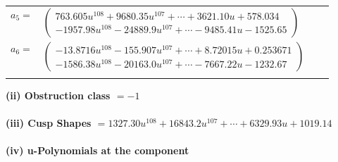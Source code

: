 \documentclass[1p]{elsarticle_modified}
\theoremstyle{definition}
\begin{document}
\begin{tabular}{m{7pt} m{180pt} m{7pt} m{180pt} }
\flushright $a_{5}=$&$\begin{pmatrix}763.605 u^{108}+9680.35 u^{107}+\cdots+3621.10 u+578.034\\-1957.98 u^{108}-24889.9 u^{107}+\cdots-9485.41 u-1525.65\end{pmatrix}$ \\
\flushright $a_{6}=$&$\begin{pmatrix}-13.8716 u^{108}-155.907 u^{107}+\cdots+8.72015 u+0.253671\\-1586.38 u^{108}-20163.0 u^{107}+\cdots-7667.22 u-1232.67\end{pmatrix}$\\&\end{tabular}
\flushleft \textbf{(ii) Obstruction class $= -1$}\\~\\
\flushleft \textbf{(iii) Cusp Shapes $= 1327.30 u^{108}+16843.2 u^{107}+\cdots+6329.93 u+1019.14$}\\~\\
\newpage\renewcommand{\arraystretch}{1}
\flushleft \textbf{(iv) u-Polynomials at the component}\newline \\
\end{document}
